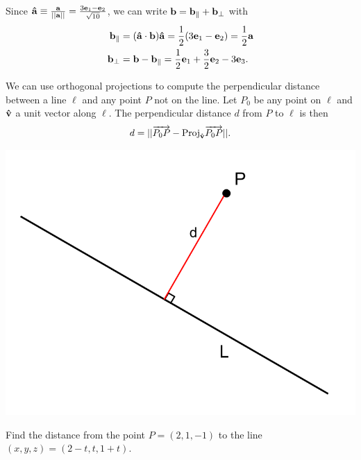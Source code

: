 \documentclass[12pt,letterpaper,reqno]{article}
\numberwithin{equation}{section}
\begin{document}
{\color{red} 
Since ${\bf \hat{a}}\equiv \frac{{\bf a}}{||{\bf a}||}=\frac{3{\bf e}_1-{\bf e}_2}{\sqrt{10}}$, we can write ${\bf b}={\bf b}_{\parallel}+{\bf b}_{\perp}$ with  
\begin{align*}
	{\bf b}_{\parallel}&=({\bf \hat{a}}\cdot {\bf b}){\bf {\hat{a}}}=\frac{1}{2}(3{\bf e}_1-{\bf e}_2)=\frac{1}{2}{\bf a} \\
	{\bf b}_{\perp}&={\bf b}-{\bf b}_{\parallel}=\frac{1}{2}{\bf e}_1+\frac{3}{2}{\bf e}_2-3{\bf e}_3.
\end{align*}}

\begin{example}
We can use orthogonal projections to compute the perpendicular distance between a line $\ell$ and any point $P$ not on the line. Let $P_0$ be any point on $\ell$ and ${\bf \hat{v}}$ a unit vector along $\ell$. The perpendicular distance $d$ from $P$ to $\ell$ is then
\begin{align*}
	d=||\overrightarrow{P_0P}-\text{Proj}_{{\bf \hat{v}}}\overrightarrow{P_0P}||.
\end{align*}	
\end{example}

\begin{center}
	\includegraphics[scale=0.3]{figures_mvc/distance_between_line_and_point}
\end{center}

\begin{exercise}
Find the distance from the point $P=(2,1,-1)$ to the line $(x,y,z)=(2-t,t,1+t)$.	
\end{exercise}
\end{document}

